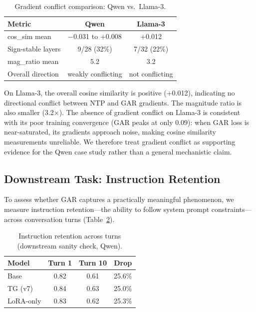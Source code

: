 \documentclass[11pt,a4paper]{article}
\begin{document}
\begin{table}[h]
\centering
\caption{Gradient conflict comparison: Qwen vs.\ Llama-3.}
\label{tab:grad_cross}
\begin{tabular}{lcc}
\toprule
Metric & Qwen & Llama-3 \\
\midrule
cos\_sim mean            & $-$0.031 to $+$0.008 & $+$0.012 \\
Sign-stable layers       & 9/28 (32\%) & 7/32 (22\%) \\
mag\_ratio mean          & 5.2 & 3.2 \\
Overall direction        & weakly conflicting & not conflicting \\
\bottomrule
\end{tabular}
\end{table}

On Llama-3, the overall cosine similarity is positive ($+$0.012), indicating no directional conflict between NTP and GAR gradients. The magnitude ratio is also smaller (3.2$\times$). The absence of gradient conflict on Llama-3 is consistent with its poor training convergence (GAR peaks at only 0.09): when GAR loss is near-saturated, its gradients approach noise, making cosine similarity measurements unreliable. We therefore treat gradient conflict as supporting evidence for the Qwen case study rather than a general mechanistic claim.

\subsection{Downstream Task: Instruction Retention}

To assess whether GAR captures a practically meaningful phenomenon, we measure instruction retention---the ability to follow system prompt constraints---across conversation turns (Table~\ref{tab:downstream}).

\begin{table}[h]
\centering
\caption{Instruction retention across turns (downstream sanity check, Qwen).}
\label{tab:downstream}
\begin{tabular}{lccc}
\toprule
Model & Turn 1 & Turn 10 & Drop \\
\midrule
Base       & 0.82 & 0.61 & 25.6\% \\
TG (v7)    & 0.84 & 0.63 & 25.0\% \\
LoRA-only  & 0.83 & 0.62 & 25.3\% \\
\bottomrule
\end{tabular}
\end{table}
\end{document}
